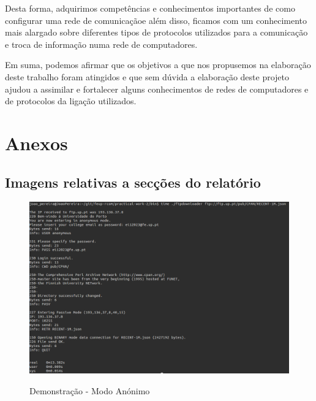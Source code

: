 \documentclass[a4paper]{article}
\begin{document}
Desta forma, adquirimos competências e conhecimentos importantes de como configurar uma rede de comunicaçãoe além disso, ficamos com um conhecimento mais alargado sobre diferentes tipos de protocolos utilizados para a comunicação e troca de informação numa rede de computadores.
 
Em suma, podemos afirmar que os objetivos a que nos propusemos na elaboração deste trabalho foram atingidos e que sem dúvida a elaboração deste projeto ajudou a assimilar e fortalecer alguns conhecimentos de redes de computadores e de protocolos da ligação utilizados.

\clearpage
{}
\renewcommand\refname{Referências}




\newpage
\appendix
\section{Anexos}

\subsection{Imagens relativas a secções do relatório}

\begin{figure}[h!]
\centering
\caption{Demonstração - Modo Anónimo}
\includegraphics[scale=0.3]{res/teste-anonymous.png}
\label{fig:anonymous}
\end{figure}
\end{document}
